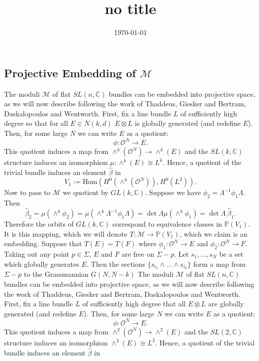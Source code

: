 \documentclass[]{article}
\title{no title}
\date{\today}
\newcommand{\C}{\mathbb{C}}
\newcommand{\Hom}{\text{Hom}}
\newcommand{\OO}{\mathcal{O}}
\newcommand{\MM}{\mathcal{M}}
\newcommand{\PP}{\mathbb{P}}
\begin{document}
	\subsection{Projective Embedding of $\MM$}
	The moduli $\MM$ of flat $SL(n,\C)$ bundles can be embedded into projective space, as we will now describe following the work of Thaddeus, Giesker and Bertram, Daskalopoulos and Wentworth. First, fix a line bundle $L$ of sufficiently high degree so that for all $E\in N(k,d)$ $E\otimes L$  is globally generated (and redefine $E$). Then, for some large $N$ we can write $E$ as a quotient:
	\begin{equation}
	\phi:\OO^N \to E.
	\end{equation}
	This quotient induces a map from $\wedge^k(\OO^N) \to \wedge^k(E)$ and the $SL(k,\C)$ structure induces an isomorphism $\mu:\wedge^k(E)\cong L^k$. Hence, a quotient of the trivial bundle induces an element $\hat{\beta}$ in 
	\begin{equation}
	V_1 := \Hom(H^0(\wedge^k(\OO^N)), H^0(L^2)).
	\end{equation}
	Now to pass to $\MM$ we quotient by $GL(k,\C)$. Suppose we have $\phi_2 = \Lambda^{-1} \phi_1 \Lambda$. Then
	\begin{equation}
		\hat{\beta}_2 = \mu(\wedge^k \phi_2) = \mu(\wedge^k \Lambda^{-1}\phi_1 \Lambda) = \det\Lambda \mu(\wedge^k \phi_1) = \det\Lambda~ \hat{\beta}_1.
	\end{equation}
	Therefore the orbits of $GL(k,\C)$ correspond to equivalence classes in $\PP(V_1)$. It is this mapping, which we will denote $T:\MM\to \PP(V_1)$, which we claim is an embedding. Suppose that $T(E) = T(F)$ where $\phi_1:\OO^N \to E$ and $\phi_2:\OO^N \to F$. Taking out any point $p\in \Sigma$, $E$ and $F$ are free on $\Sigma - p$. Let $s_1,...,s_N$ be a set which globally generates $E$. Then the sections $\{s_{i_1}\wedge...\wedge s_{i_k}\}$ form a map from $\Sigma - p$ to the Grassmannian $G(N,N-k)$
	\iffalse
	The moduli $\MM$ of flat $SL(n,\C)$ bundles can be embedded into projective space, as we will now describe following the work of Thaddeus, Giesker and Bertram, Daskalopoulos and Wentworth. First, fix a line bundle $L$ of sufficiently high degree that all $E\otimes L$  are globally generated (and redefine $E$). Then, for some large $N$ we can write $E$ as a quotient:
	\begin{equation}
		\phi:\OO^N \to E.
	\end{equation}
	This quotient induces a map from $\wedge^2(\OO^N) \to \wedge^2(E)$ and the $SL(2,\C)$ structure induces an isomorphism $\wedge^2(E)\cong L^2$. Hence, a quotient of the trivial bundle induces an element $\hat{\beta}$ in 
\end{document}
